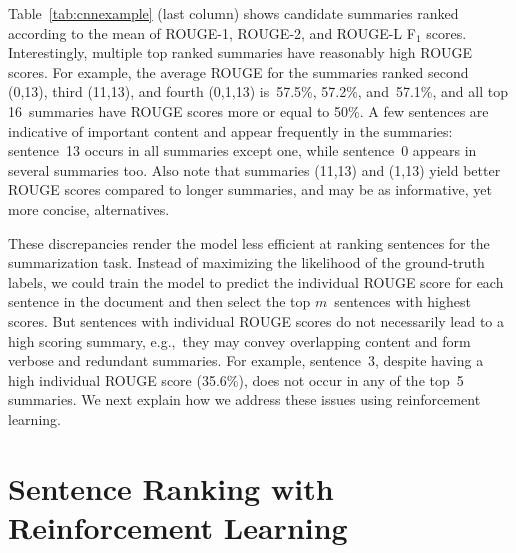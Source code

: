 \documentclass[11pt,a4paper]{article}
\begin{document}
Table~\ref{tab:cnnexample} (last column) shows candidate summaries 
ranked according to the mean of \mbox{ROUGE-1}, \mbox{ROUGE-2}, and
\mbox{ROUGE-L} F$_1$ scores. Interestingly, multiple top ranked summaries have reasonably high
ROUGE scores. For example, the average ROUGE for the summaries ranked
second (0,13), third (11,13), and fourth (0,1,13) is~57.5\%, 57.2\%,
and~57.1\%, and all top 16~summaries have ROUGE scores more or equal
to 50\%. A few sentences are indicative of important content and
appear frequently in the summaries: sentence~13 occurs in all
summaries except one, while sentence~0 appears in several summaries
too. Also note that summaries (11,13) and (1,13) yield better ROUGE
scores compared to longer summaries, and may be as informative, yet
more concise, alternatives.

These discrepancies render the model less efficient at ranking
sentences for the summarization task. Instead of maximizing the
likelihood of the ground-truth labels, we could train the model to
predict the individual ROUGE score for each sentence in the document
and then select the top $m$~sentences with highest scores. But
sentences with individual ROUGE scores do not necessarily lead to a
high scoring summary, e.g.,~they may convey overlapping content and
form verbose and redundant summaries. For example, sentence~3, despite
having a high individual ROUGE score (35.6\%), does not occur in any
of the top~5 summaries. We next explain how we address these issues
using reinforcement learning.



































\section{Sentence Ranking with Reinforcement Learning} 
\label{sec:reinforced}
\end{document}
